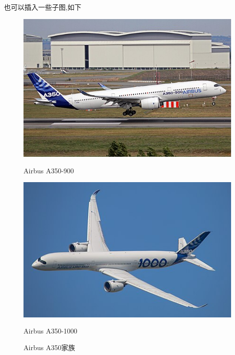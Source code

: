 也可以插入一些子图,如下 
\begin{figure}[!ht]
    \centering 
    \begin{subcaptionblock}{0.48\textwidth}
        \centering 
        \includegraphics[width=\linewidth]{./figure/A359.jpg}
        \caption{Airbus A350-900}
        \label{fig:A359}
    \end{subcaptionblock}
    \begin{subcaptionblock}{0.48\textwidth}
        \centering
        \includegraphics[width=\linewidth]{./figure/A35k.jpg}
        \caption{Airbus A350-1000}
        \label{fig:A35k}
    \end{subcaptionblock}
    \caption{Airbus A350家族}
    \label{fig:A350}
\end{figure}

